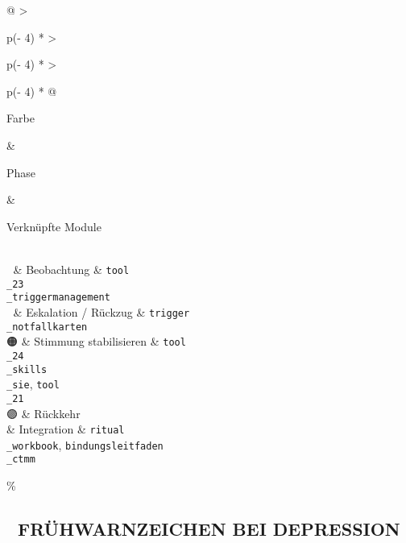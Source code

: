 \begin{longtable}[]{@{}
  >{\raggedright\arraybackslash}p{(\columnwidth - 4\tabcolsep) * }
  >{\raggedright\arraybackslash}p{(\columnwidth - 4\tabcolsep) * }
  >{\raggedright\arraybackslash}p{(\columnwidth - 4\tabcolsep) * }@{}}
\toprule\noalign{}
\begin{minipage}[b]{\linewidth}\raggedright
Farbe
\end{minipage} \& \begin{minipage}[b]{\linewidth}\raggedright
Phase
\end{minipage} \& \begin{minipage}[b]{\linewidth}\raggedright
Verknüpfte Module
\end{minipage} \\
\midrule\noalign{}
\endhead
\bottomrule\noalign{}
\endlastfoot
🔵 \& Beobachtung \& \texttt{tool\\_23\\_triggermanagement} \\
🔴 \& Eskalation / Rückzug \& \texttt{trigger\\_notfallkarten} \\
🟠 \& Stimmung stabilisieren \& \texttt{tool\\_24\\_skills\\_sie}, \texttt{tool\\_21} \\
🟣 \& Rückkehr \\& Integration \& \texttt{ritual\\_workbook}, \texttt{bindungsleitfaden\\_ctmm} \\
\end{longtable}

\hypertarget{fruxfchwarnzeichen-bei-depression}{\%
\subsection{🧩 FRÜHWARNZEICHEN BEI DEPRESSION}\label{fruxfchwarnzeichen-bei-depression}}

